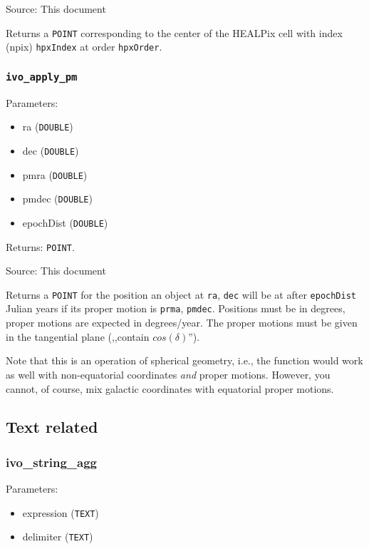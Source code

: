 \documentclass[11pt,a4paper]{ivoa}
\begin{document}
Source: This document

Returns a \texttt{POINT} corresponding to the center of the HEALPix cell
with index (npix) \texttt{hpxIndex} at order \texttt{hpxOrder}.

\subsubsection{\texttt{ivo\_apply\_pm}}

Parameters:

\begin{itemize}
	\item ra (\texttt{DOUBLE})
	\item dec (\texttt{DOUBLE})
	\item pmra (\texttt{DOUBLE})
	\item pmdec (\texttt{DOUBLE})
	\item epochDist (\texttt{DOUBLE})
\end{itemize}

Returns: \texttt{POINT}.

Source: This document

Returns a \texttt{POINT} for the position an object at \texttt{ra},
\texttt{dec} will be at after \texttt{epochDist} Julian years if its proper
motion is \texttt{prma}, \texttt{pmdec}.  Positions must be in degrees,
proper motions are expected in degrees/year. The proper motions must be
given in the tangential plane (,,contain $cos(\delta)$'').

Note that this is an operation of spherical geometry, i.e., the function
would work as well with non-equatorial coordinates \emph{and} proper
motions.  However, you cannot, of course, mix galactic coordinates with
equatorial proper motions.


\subsection{Text related}

\subsubsection{ivo\_string\_agg}

Parameters:

\begin{itemize}
	\item expression (\texttt{TEXT})
	\item delimiter (\texttt{TEXT})
\end{itemize}
\end{document}
